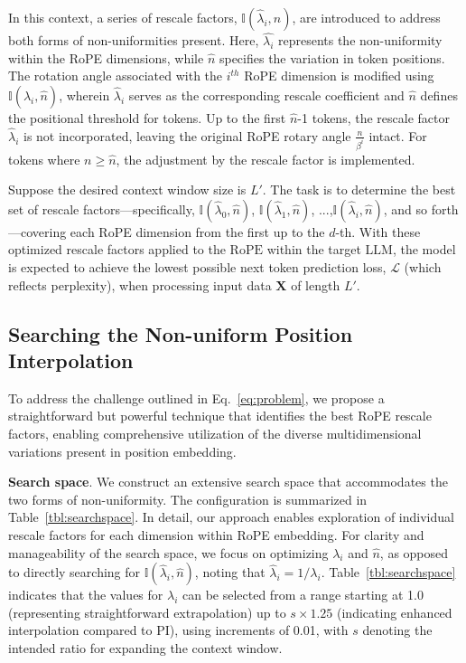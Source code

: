 In this context, a series of rescale factors, $\mathbb{I}(\hat{\lambda}_{i},\hat{n})$, are introduced to address both forms of non-uniformities present. Here, $\hat{\lambda_i}$ represents the non-uniformity within the RoPE dimensions, while $\hat{n}$ specifies the variation in token positions. The rotation angle associated with the $i^{th}$ RoPE dimension is modified using $\mathbb{I}(\hat{\lambda}_{i},\hat{n})$, wherein $\hat\lambda_{i}$ serves as the corresponding rescale coefficient and $\hat{n}$ defines the positional threshold for tokens. Up to the first $\hat{n}$-1 tokens, the rescale factor $\hat\lambda_{i}$ is not incorporated, leaving the original RoPE rotary angle $\frac{n}{\beta^i}$ intact. For tokens where $n\ge\hat{n}$, the adjustment by the rescale factor is implemented.

Suppose the desired context window size is $L'$. The task is to determine the best set of rescale factors—specifically, $\mathbb{I}(\hat{\lambda}_{0},\hat{n})$, $\mathbb{I}(\hat{\lambda}_{1},\hat{n})$, ...,$\mathbb{I}(\hat{\lambda}_{i},\hat{n})$, and so forth—covering each RoPE dimension from the first up to the $d$-th. With these optimized rescale factors applied to the $\text{RoPE}$ within the target $\text{LLM}$, the model is expected to achieve the lowest possible next token prediction loss, $\mathcal{L}$ (which reflects perplexity), when processing input data $\mathbf{X}$ of length $L'$.

\subsection{Searching the Non-uniform Position Interpolation}

To address the challenge outlined in Eq.~\ref{eq:problem}, we propose a straightforward but powerful technique that identifies the best RoPE rescale factors, enabling comprehensive utilization of the diverse multidimensional variations present in position embedding.

\textbf{Search space}. We construct an extensive search space that accommodates the two forms of non-uniformity. The configuration is summarized in Table~\ref{tbl:searchspace}. In detail, our approach enables exploration of individual rescale factors for each dimension within RoPE embedding. For clarity and manageability of the search space, we focus on optimizing $\lambda_i$ and $\hat{n}$, as opposed to directly searching for $\mathbb{I}(\hat{\lambda}_{i},\hat{n})$, noting that $\hat{\lambda}_{i}=1/\lambda_i$. Table~\ref{tbl:searchspace} indicates that the values for $\lambda_i$ can be selected from a range starting at 1.0 (representing straightforward extrapolation) up to $s\times1.25$ (indicating enhanced interpolation compared to PI), using increments of 0.01, with $s$ denoting the intended ratio for expanding the context window.

